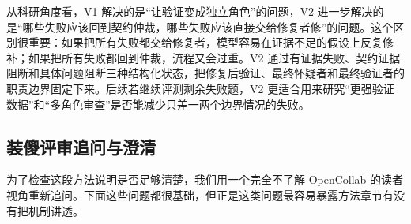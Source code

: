 \documentclass[UTF8,a4paper,11pt]{ctexart}
\begin{document}
从科研角度看，V1 解决的是“让验证变成独立角色”的问题，V2 进一步解决的是“哪些失败应该回到契约仲裁，哪些失败应该直接交给修复者修”的问题。这个区别很重要：如果把所有失败都交给修复者，模型容易在证据不足的假设上反复修补；如果把所有失败都回到仲裁，流程又会过重。V2 通过有证据失败、契约证据阻断和具体问题阻断三种结构化状态，把修复后验证、最终怀疑者和最终验证者的职责边界固定下来。后续若继续评测剩余失败题，V2 更适合用来研究“更强验证数据”和“多角色审查”是否能减少只差一两个边界情况的失败。

\subsection{装傻评审追问与澄清}

为了检查这段方法说明是否足够清楚，我们用一个完全不了解 OpenCollab 的读者视角重新追问。下面这些问题都很基础，但正是这类问题最容易暴露方法章节有没有把机制讲透。
\end{document}
